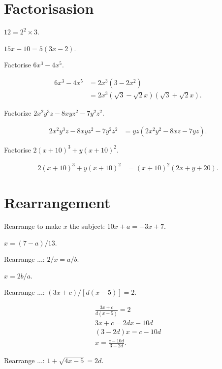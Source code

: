 \documentclass[8pt]{article}
\begin{document}
	\section{Factorisasion}
		\exmp {} \(12 = 2^2 \times 3\).

		\exmp {} \(15x - 10 = 5 (3x-2)\).

		\prob Factorise \(6x^3 - 4x^5\).

		\solution

		\begin{align*}
			6x^3 - 4x^5 &= 2x^3 (3 - 2x^2)\\
			            &= 2x^3 (\sqrt{3} - \sqrt{2}x) (\sqrt{3} + \sqrt{2}x).
		\end{align*}

		\prob Factorize \(2x^2 y^3 z - 8 x y z^2 - 7 y^2 z^2\).

		\solution

		\begin{align*}
			2x^2 y^3 z - 8 x y z^2 - 7 y^2 z^2 &= yz (2x^2 y^2 - 8xz - 7 yz).
		\end{align*}

		\prob Factorise \(2(x+10)^3 + y(x+10)^2\).

		\solution

		\begin{align*}
			2(x+10)^3 + y(x+10)^2 &= (x+10)^2 (2x + y + 20).
		\end{align*}

	\section{Rearrangement}
		\prob Rearrange to make \(x\) the subject: \(10x + a = -3x + 7\).

		\solution \(x = (7-a)/13\).

		\prob Rearrange ...: \(2/x = a/b\).

		\solution \(x = 2b / a\).

		\prob Rearrange ...: \((3x+c)/[d(x-5)]=2\).

		\solution

		\begin{align*}
			\frac{3x+c}{d(x-5)} = 2\\
			3x+c = 2dx - 10d\\
			(3-2d) x = c-10d\\
			x = \frac{c-10d}{3-2d}.
		\end{align*}

		\prob Rearrange ...: \(1 + \sqrt{4x-5} = 2d\).
\end{document}
